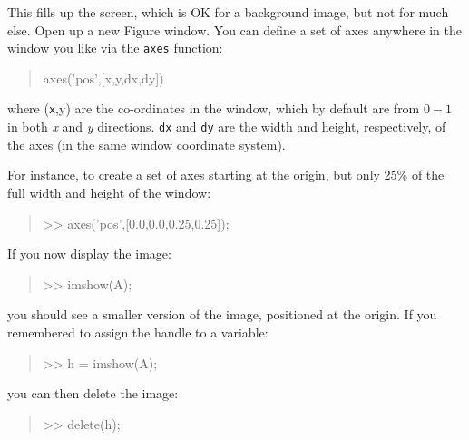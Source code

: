 \documentclass{tufte-book} %
\newenvironment{docspec}{\begin{quotation}\ttfamily\parskip0pt\parindent0pt\ignorespaces}{\end{quotation}}
\begin{document}
This fills up the screen, which is OK for a background image, but not for much else. Open up a new \textsf{Figure window}. You can define a set of axes anywhere in the window you like via the \texttt{axes} function:
\begin{docspec}
axes('pos',[x,y,dx,dy])
\end{docspec}
where (\texttt{x},y) are the co-ordinates in the window, which by default are from \(0-1\) in both \textit{x} and \textit{y} directions. \texttt{dx} and \texttt{dy} are the width and height, respectively, of the axes (in the same window coordinate system).

For instance, to create a set of axes starting at the origin, but only 25\% of the full width and height of the window:
\begin{docspec}
>> axes('pos',[0.0,0.0,0.25,0.25]);
\end{docspec}
If you now display the image:
\begin{docspec}
>> imshow(A);
\end{docspec}
 you should see a smaller version of the image, positioned at the origin. If you remembered to assign the handle to a variable:
\begin{docspec}
>> h = imshow(A);
\end{docspec}
you can then delete the image:
\begin{docspec}
>> delete(h);
\end{docspec}
\end{document}
